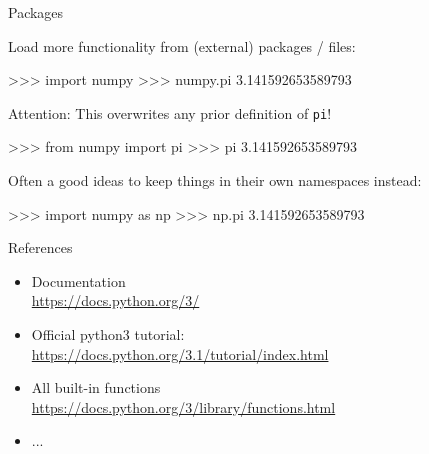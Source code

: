 \documentclass[10pt]{beamer}
\begin{document}
\begin{frame}[fragile]{Packages}

    Load more functionality from (external) packages / files:

    \begin{pythoncode}
        >>> import numpy
        >>> numpy.pi
        3.141592653589793
    \end{pythoncode}

    \pause

    Attention: This overwrites any prior definition of \texttt{pi}!
    \begin{pythoncode}
        >>> from numpy import pi
        >>> pi
        3.141592653589793
    \end{pythoncode}

    \pause

    Often a good ideas to keep things in their own namespaces instead:
    \begin{pythoncode}
        >>> import numpy as np
        >>> np.pi
        3.141592653589793
    \end{pythoncode}

\end{frame}


\begin{frame}[fragile]{References}

    \begin{itemize}
        \item Documentation\\
            \url{https://docs.python.org/3/}
        \item \pause Official python3 tutorial:\\
            \url{https://docs.python.org/3.1/tutorial/index.html}
        \item \pause All built-in functions\\
        	\url{https://docs.python.org/3/library/functions.html}
        \item \pause ...

    \end{itemize}

\end{frame}
\end{document}
